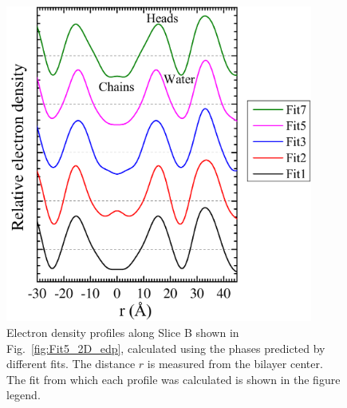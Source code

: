 \begin{figure}[htbp]
  \centering
  \includegraphics[width=0.9\textwidth]{figures/ripple/LAXS/minor_diff_models}
  \caption{Electron density profiles along Slice B shown in Fig.~\ref{fig:Fit5_2D_edp}, 
  calculated using the phases
  predicted by different fits. The distance $r$ is measured from the bilayer 
  center. The fit from which each profile was calculated
  is shown in the figure legend.}
  \label{fig:minor_diff_models}
\end{figure}

